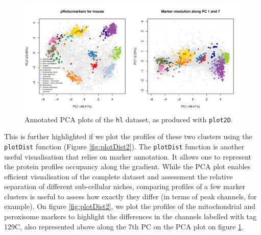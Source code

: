 \begin{figure}[!ht]
  \centering
\begin{knitrout}
\color{fgcolor}\begin{kframe}
\begin{alltt}
\hlstd{(} \hlstd{=} \hlstd{(}\hlstd{,} \hlstd{))}
  \hlstd{=} \hlstd{)}
  \hlstd{=} \hlstd{)}
  \hlstd{=} \hlstd{(}\hlstd{,} \hlstd{),}  \hlstd{=} \hlstd{)}
\end{alltt}
\end{kframe}
\includegraphics[width=\textwidth]{figure/plotmarkers-1} 

\end{knitrout}
\caption{Annotated PCA plots of the \texttt{hl} dataset, as produced
  with \texttt{plot2D}.}
  \label{fig:plotmarkers}
\end{figure}


This is further highlighted if we plot the
profiles of these two clusters using the \texttt{plotDist} function
(Figure \ref{fig:plotDist2}). The \texttt{plotDist} function is
another useful visualisation that relies on marker annotation. It
allows one to represent the protein profiles occupancy along the
gradient. While the PCA
plot enables efficient visualisation of the complete dataset and
assessment the relative separation of different sub-cellular niches,
comparing profiles of a few marker clusters is useful to assess how
exactly they differ (in terms of peak channels, for example). On
figure \ref{fig:plotDist2}, we plot the profiles of the 
mitochondrial and peroxisome markers to highlight the differences 
in the channels labelled with tag 129C, also represented above  
along the 7th PC on the PCA plot on figure \ref{fig:plotmarkers}.

